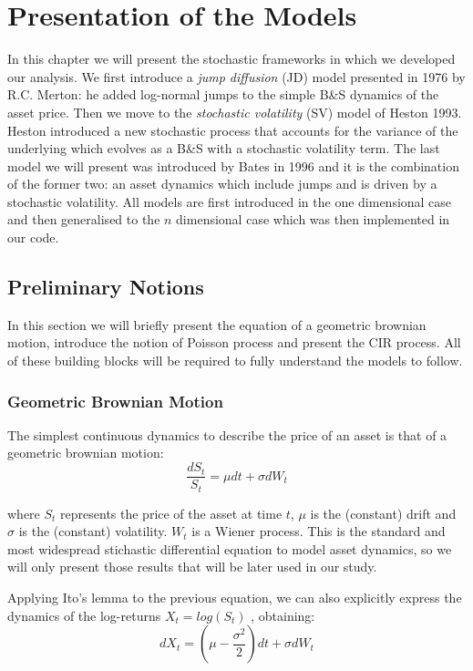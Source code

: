 \chapter{Presentation of the Models}
\label{chpr:models}
In this chapter we will present the stochastic frameworks in which we developed our analysis. We first introduce a \textit{jump diffusion} (JD) model presented in 1976 by R.C. Merton: he added log-normal jumps to the simple B\&S dynamics of the asset price. Then we move to the \textit{stochastic volatility} (SV) model of Heston 1993. Heston introduced a new stochastic process that accounts for the variance of the underlying which evolves as a B\&S  with a stochastic volatility term.
The last model we will present was introduced by Bates in 1996 and it is the combination of the former two: an asset dynamics which include jumps and is driven by a stochastic volatility.
All models are first introduced in the one dimensional case and then generalised to the $n$ dimensional case which was then implemented in our code.

\bigskip

\section{Preliminary Notions}

In this section we will briefly present the equation of a geometric brownian motion, introduce the notion of Poisson process and present the 
CIR process. All of these building blocks will be required to fully understand the models to follow.


\subsection{Geometric Brownian Motion}
The simplest continuous dynamics to describe the price of an asset is that of a geometric brownian motion:
\begin{equation}
	\label{eq:GBM}
	\frac{dS_t}{S_t} = \mu dt + \sigma dW_t
\end{equation}

where $S_t$ represents the price of the asset at time $t$, $\mu$ is the (constant) drift and $\sigma$ is the (constant) volatility. $W_t$ is a Wiener process.
This is the standard and most widespread stichastic differential equation to model asset dynamics, so we will only present those results that will be later used in our study.


Applying Ito's lemma to the previous equation, we can also explicitly express the dynamics of the log-returns $X_t = log(S_t)$ , obtaining:
\begin{equation}
	dX_t = (\mu - 	\frac{\sigma^2}{2}) dt + \sigma dW_t
\end{equation}

